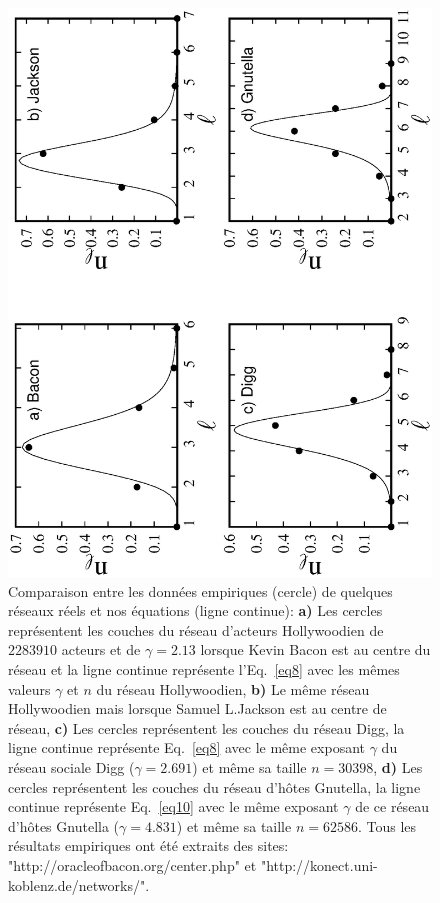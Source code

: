 \begin{figure}[h!]
	\centering
	\includegraphics[scale=0.6,angle=-90]{./figures/couch-reel}
	\caption{Comparaison entre les données empiriques (cercle) de quelques réseaux réels et nos équations (ligne continue): \textbf{a)} Les cercles représentent les couches du réseau d’acteurs Hollywoodien de $2283910$ acteurs et de $\gamma=2.13$ lorsque Kevin Bacon est au centre du réseau et la ligne continue représente l'Eq.~\eqref{eq8} avec les mêmes valeurs $\gamma$ et $n$ du réseau Hollywoodien, \textbf{b)} Le même réseau Hollywoodien mais lorsque Samuel L.Jackson est au centre de réseau, \textbf{c)} Les cercles représentent les couches du réseau Digg, la ligne continue représente Eq.~\eqref{eq8} avec le même exposant $\gamma$ du réseau sociale Digg ($\gamma=2.691$) et même sa taille $n=30398$, \textbf{d)} Les cercles représentent les couches du réseau d’h{\^o}tes Gnutella, la ligne continue représente Eq.~\eqref{eq10} avec le même exposant $\gamma$ de ce réseau d’hôtes Gnutella ($\gamma=4.831$) et même sa taille $n=62586$. Tous les résultats empiriques ont été extraits des sites: "http://oracleofbacon.org/center.php" et "http://konect.uni-koblenz.de/networks/".}	
	\label{couch-reel}
\end{figure}
    
